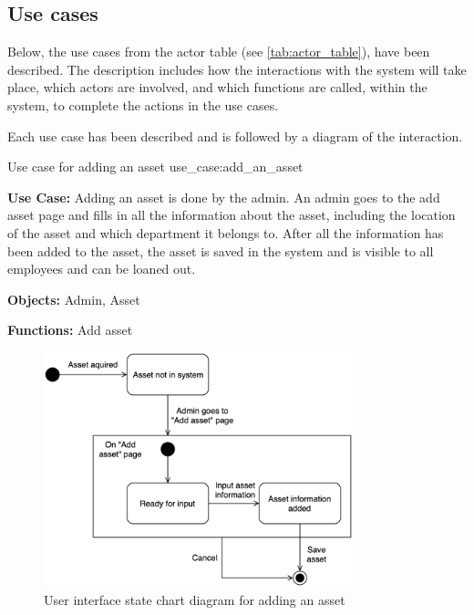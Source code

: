 \subsection{Use cases}\label{ssc:usecases}
Below, the use cases from the actor table (see \autoref{tab:actor_table}), have been described. The description includes how the interactions with the system will take place, which actors are involved, and which functions are called, within the system, to complete the actions in the use cases.
\par
Each use case has been described and is followed by a diagram of the interaction.
\newpage

    {Use case for adding an asset}
    {use_case:add_an_asset}
    {
        \textbf{Use Case:} Adding an asset is done by the admin. An admin goes to the add asset page and fills in all the information about the asset, including the location of the asset and which department it belongs to. After all the information has been added to the asset, the asset is saved in the system and is visible to all employees and can be loaned out.
    
        \vskip 0.2cm
        
        \textbf{Objects:} Admin, Asset
        
        \vskip 0.2cm
        
        \textbf{Functions:} Add asset
    }

\begin{figure}[H]
    \centering
    \includegraphics[width=0.8\textwidth]{figures/UC_Add_asset.png}
    \caption{User interface state chart diagram for adding an asset}
    \label{fig:add_asset_statechart}
\end{figure}

